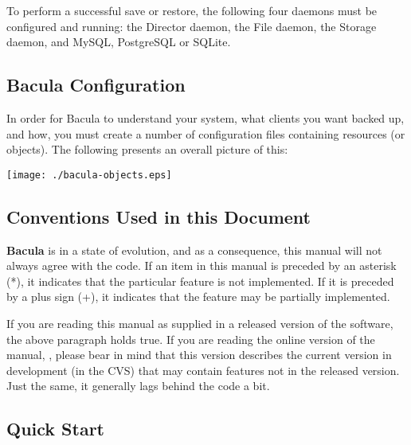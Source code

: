 To perform a successful save or restore, the following four daemons must be
configured and running: the Director daemon, the File daemon, the Storage
daemon, and MySQL, PostgreSQL or SQLite. 

\subsection*{Bacula Configuration}

In order for Bacula to understand your system, what clients you want backed
up, and how, you must create a number of configuration files containing
resources (or objects). The following presents an overall picture of this: 

\texttt{[image: ./bacula-objects.eps]} 

\subsection*{Conventions Used in this Document}

{\bf Bacula} is in a state of evolution, and as a consequence, this manual
will not always agree with the code. If an item in this manual is preceded by
an asterisk (*), it indicates that the particular feature is not implemented.
If it is preceded by a plus sign (+), it indicates that the feature may be
partially implemented. 

If you are reading this manual as supplied in a released version of the
software, the above paragraph holds true. If you are reading the online
version of the manual, 
, please bear in
mind that this version describes the current version in development (in the
CVS) that may contain features not in the released version. Just the same, it
generally lags behind the code a bit. 

\subsection*{Quick Start}

